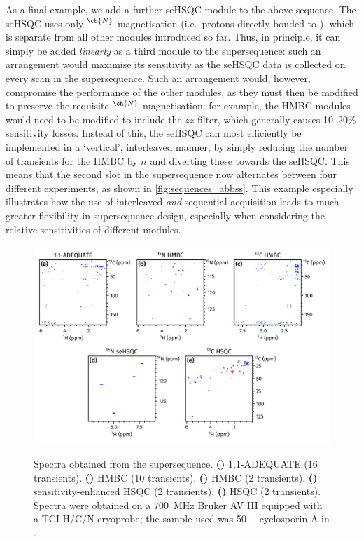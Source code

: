 \documentclass[a4paper,12pt]{article}
\newcommand{\carbon}{\ch{^{13}C}}
\newcommand{\nitrogen}{\ch{^{15}N}}
\newcommand{\magn}[1]{\ch{^1H}$^{#1}$}
\newcommand{\changed}[1]{{\color{DodgerBlue!75!blue}#1}}
\newcommand*{\cyclo}{Spectra were obtained on a \SI{700}{\MHz} Bruker AV III equipped with a TCI H/C/N cryoprobe; the sample used was \SI{50}{\milli\molar} cyclosporin A in \ch{C6D6}.}
\begin{document}
\begin{refsection}
\changed{
As a final example, we add a further \nitrogen{} seHSQC module to the above sequence.
The \nitrogen{} seHSQC uses only \magn{\ch{N}} magnetisation (i.e.\ protons directly bonded to \nitrogen{}), which is separate from all other modules introduced so far.
Thus, in principle, it can simply be added \textit{linearly} as a third module to the supersequence: such an arrangement would maximise its sensitivity as the \nitrogen{} seHSQC data is collected on every scan in the supersequence.
Such an arrangement would, however, compromise the performance of the other modules, as they must then be modified to preserve the requisite \magn{\ch{N}} magnetisation: for example, the HMBC modules would need to be modified to include the $zz$-filter\autocite{Kupce2018CC,Kupce2019JMR}, which generally causes 10--20\% sensitivity losses.
Instead of this, the \nitrogen{} seHSQC can most efficiently be implemented in a `vertical', interleaved manner, by simply reducing the number of transients for the \nitrogen{} HMBC by $n$ and diverting these towards the \nitrogen{} seHSQC.
This means that the second slot in the supersequence now alternates between four different experiments, as shown in \cref{fig:sequences_abbss}.
This example especially illustrates how the use of interleaved \textit{and} sequential acquisition leads to much greater flexibility in supersequence design, especially when considering the relative sensitivities of different modules.
}

\begin{figure}[ht]
    \centering
    \includegraphics[width=\textwidth]{abbss.png}
    {\label{fig:abbss_adeq}}
    {\label{fig:abbss_n_hmbc}}
    {\label{fig:abbss_c_hmbc}}
    {\label{fig:abbss_n_sehsqc}}
    {\label{fig:abbss_c_hsqc}}
    \caption{
        Spectra obtained from the  supersequence.
        \textbf{()} 1,1-ADEQUATE (16 transients).
        \textbf{()} \nitrogen{} HMBC (10 transients).
        \textbf{()} \carbon{} HMBC (2 transients).
        \textbf{()} \nitrogen{} sensitivity-enhanced HSQC (2 transients).
        \textbf{()} \carbon{} HSQC (2 transients).
        \cyclo{}
    }
    \label{fig:abbss}
\end{figure}


\end{refsection}
\end{document}
